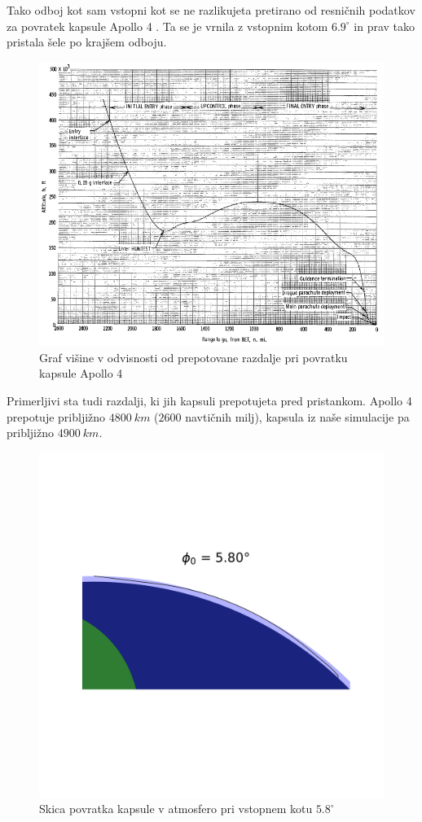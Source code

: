 \documentclass[11pt,a4paper]{article}
\begin{document}
Tako odboj kot sam vstopni kot se ne razlikujeta pretirano od resni\v cnih podatkov za povratek kapsule Apollo 4 \cite{entry-aerodynamics}. Ta se je vrnila z vstopnim kotom $ 6.9^\circ $ in prav tako pristala \v sele po kraj\v sem odboju.


\begin{figure}[H]
	\begin{center}
		\includegraphics[width=12cm]{apollo4_return_trajectory.png}
		\caption{Graf vi\v sine v odvisnosti od prepotovane razdalje pri povratku kapsule Apollo 4}
	\end{center}
\end{figure}

Primerljivi sta tudi razdalji, ki jih kapsuli prepotujeta pred pristankom. Apollo 4 prepotuje priblji\v zno $ 4800\ km $ ($ 2600 $ navti\v cnih milj), kapsula iz na\v se simulacije pa priblji\v zno $ 4900\ km $.

\begin{figure}[H]
	\begin{center}
		\includegraphics[width=12cm]{5_8_scheme.pdf}
		\caption{Skica povratka kapsule v atmosfero pri vstopnem kotu $ 5.8^\circ $}
	\end{center}
\end{figure}
\end{document}
